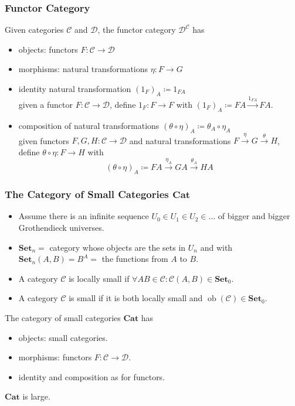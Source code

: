 \documentclass[UTF8,aspectratio=43,11pt,colorlinks,compress,openany]{beamer}%
\begin{document}
\begin{frame}\frametitle{Functor Category}
\begin{definition}
Given categories $\mathcal{C}$ and $\mathcal{D}$, the functor category $\mathcal{D}^{\mathcal{C}}$ has
\begin{itemize}
	\item objects: functors $F:\mathcal{C}\to\mathcal{D}$
	\item morphisms: natural transformations $\eta: F\to G$
	\item identity natural transformation $(1_F)_A\coloneqq 1_{FA}$\\
	given a functor $F:\mathcal{C}\to\mathcal{D}$, define $1_F: F\to F$ with $(1_F)_A\coloneqq FA\xrightarrow{1_{FA}}FA$.
	\item composition of natural transformations $(\theta\circ\eta)_A\coloneqq \theta_A\circ\eta_A$\\
	given functors $F,G,H:\mathcal{C}\to\mathcal{D}$ and natural transformations $F\xrightarrow{\eta}G\xrightarrow{\theta}H$, define $\theta\circ\eta: F\to H$ with
\[(\theta\circ\eta)_A\coloneqq FA\xrightarrow{\eta_A}GA\xrightarrow{\theta_A}HA\]
\end{itemize}
\end{definition}
\end{frame}

\begin{frame}\frametitle{The Category of Small Categories $\mathbf{Cat}$}
\begin{itemize}
	\item Assume there is an infinite sequence $U_0\in U_1\in U_2\in\dots$ of bigger and bigger Grothendieck universes.
	\item $\mathbf{Set}_n=$ category whose objects are the sets in $U_n$ and with $\mathbf{Set}_n(A,B)=B^A=$ the functions from $A$ to $B$.
	\item A category $\mathcal{C}$ is locally small if $\forall AB\in\mathcal{C}: \mathcal{C}(A,B)\in\mathbf{Set}_0$.
	\item A category $\mathcal{C}$ is small if it is both locally small and $\operatorname{ob}(\mathcal{C})\in\mathbf{Set}_0$.
\end{itemize}
\begin{definition}
The category of small categories $\mathbf{Cat}$ has
\begin{itemize}
	\item objects: small categories.
	\item morphisms: functors $F:\mathcal{C}\to\mathcal{D}$.
	\item identity and composition as for functors.
\end{itemize}
\end{definition}
$\mathbf{Cat}$ is large.
\end{frame}
\end{document}
